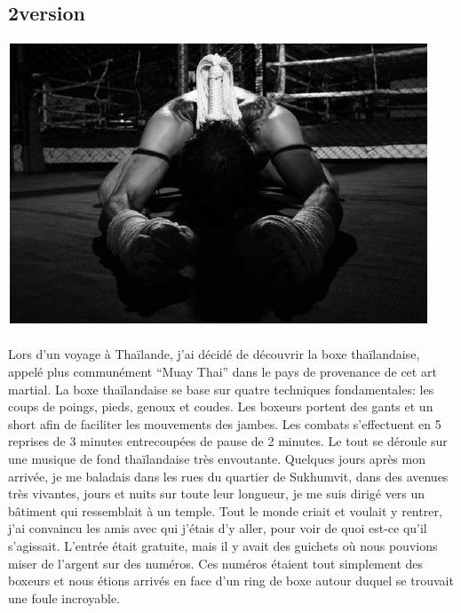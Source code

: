 \subsection{2\ieme version}

\begin{center}
	\includegraphics[scale=0.7]{Thai1.jpg}
\end{center}

\paragraph{} Lors d'un voyage à Thaïlande, j'ai décidé de découvrir la boxe
thaïlandaise, appelé plus communément ``Muay Thai'' dans le pays de provenance
de cet art martial. La boxe thaïlandaise se base sur quatre techniques
fondamentales: les coups de poings, pieds, genoux et coudes. Les boxeurs
portent des gants et un short afin de faciliter les mouvements des jambes. Les
combats s'effectuent en 5 reprises de 3 minutes entrecoupées de pause de 2
minutes. Le tout se déroule sur une musique de fond thaïlandaise très
envoutante.  Quelques jours après mon arrivée, je me baladais dans les rues du
quartier de Sukhumvit, dans des avenues très vivantes, jours et nuits sur toute
leur longueur, je me suis dirigé vers un bâtiment qui ressemblait à un temple.
Tout le monde criait et voulait y rentrer, j'ai convaincu les amis avec qui
j'étais d'y aller, pour voir de quoi est-ce qu'il s'agissait.  L'entrée était
gratuite, mais il y avait des guichets où nous pouvions miser de l'argent sur
des numéros. Ces numéros étaient tout simplement des boxeurs et nous étions
arrivés en face d'un ring de boxe autour duquel se trouvait une foule
incroyable.

